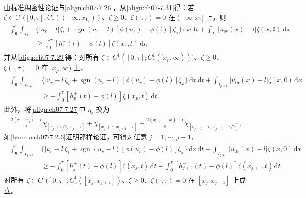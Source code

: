 \documentclass[../../main.tex]{subfiles}%
\begin{document}
\begin{remark}\label{remark:ch07-7.2.4}
由标准稠密性论证与\eqref{align:ch07-7.26}，从\eqref{align:ch07-7.31}得：若 $\zeta\in C^1([0,\tau];C^1_c((-\infty,x_1]))$、$\zeta\geqslant0$、$\zeta(\cdot,\tau)=0$ 在 $(-\infty,x_1]$ 上，则
\begin{align}
\begin{aligned}
\int_0^\tau\int_{I_1}&\{|u_r-l|\zeta_t+\operatorname{sgn}(u_r-l)[\phi(u_r)-\phi(l)]\zeta_x\}\,\mathrm{d}x\,\mathrm{d}t
+\int_{I_1}|u_{0r}(x)-l|\zeta(x,0)\,\mathrm{d}x\\
&\geqslant\int_0^\tau[h_1^-(t)-\phi(l)]\zeta(x_1,t)\,\mathrm{d}t,
\end{aligned} \label{align:ch07-7.32}
\end{align}
并从\eqref{align:ch07-7.29}得：对所有 $\zeta\in C^1([0,\tau];C^1_c([x_p,\infty)))$、$\zeta\geqslant0$、$\zeta(\cdot,\tau)=0$ 在 $[x_p,\infty)$ 上，
\begin{align*}
\begin{aligned}
\int_0^\tau\int_{I_{p+1}}&\{|u_r-l|\zeta_t+\operatorname{sgn}(u_r-l)[\phi(u_r)-\phi(l)]\zeta_x\}\,\mathrm{d}x\,\mathrm{d}t
+\int_{I_{p+1}}|u_{0r}(x)-l|\zeta(x,0)\,\mathrm{d}x\\
&\geqslant-\int_0^\tau[h_p^+(t)-\phi(l)]\zeta(x_p,t)\,\mathrm{d}t.
\end{aligned}
\end{align*}
此外，将\eqref{align:ch07-7.27}中 $\eta_\epsilon$ 换为
\begin{align*}
\frac{2(x-x_j)-\epsilon}{\epsilon}\chi_{[x_j+\epsilon/2,\,x_j+\epsilon]}+\chi_{[x_j+\epsilon,\,x_{j+1}-\epsilon]}+\frac{2(x_{j+1}-x)-\epsilon}{\epsilon}\chi_{[x_{j+1}-\epsilon,\,x_{j+1}-\epsilon/2]},
\end{align*}
如\cref{lemma:ch07-7.2.6}证明那样论证，可得对任意 $j=1,\cdots ,p-1$，
\begin{align*}
\begin{aligned}
\int_0^\tau\int_{I_{j+1}}&\{|u_r-l|\zeta_t+\operatorname{sgn}(u_r-l)[\phi(u_r)-\phi(l)]\zeta_x\}\,\mathrm{d}x\,\mathrm{d}t
+\int_{I_{j+1}}|u_{0r}(x)-l|\zeta(x,0)\,\mathrm{d}x\\
&\geqslant-\int_0^\tau[h_j^+(t)-\phi(l)]\zeta(x_j,t)\,\mathrm{d}t
+\int_0^\tau[h_{j+1}^-(t)-\phi(l)]\zeta(x_{j+1},t)\,\mathrm{d}t
\end{aligned}
\end{align*}
对所有 $\zeta\in C^1([0,\tau];C^1_c([x_j,x_{j+1}])$、$\zeta\geqslant0$、$\zeta(\cdot,\tau)=0$ 在 $[x_j,x_{j+1}]$ 上成立。
\end{remark}
\end{document}
